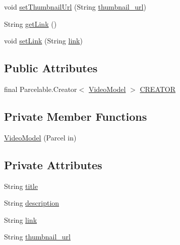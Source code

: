 \begin{DoxyCompactItemize}
\item 
void \hyperlink{classorg_1_1buildmlearn_1_1videocollection_1_1data_1_1VideoModel_a73e2eac36501e245f07df1b06d91e07a}{set\+Thumbnail\+Url} (String \hyperlink{classorg_1_1buildmlearn_1_1videocollection_1_1data_1_1VideoModel_ad793fdd9dc6317f284926a25a1906372}{thumbnail\+\_\+url})
\item 
String \hyperlink{classorg_1_1buildmlearn_1_1videocollection_1_1data_1_1VideoModel_a16fdc757e743c44f10fdc347318a887f}{get\+Link} ()
\item 
void \hyperlink{classorg_1_1buildmlearn_1_1videocollection_1_1data_1_1VideoModel_a432dd877f44698728efcd28c8bf20765}{set\+Link} (String \hyperlink{classorg_1_1buildmlearn_1_1videocollection_1_1data_1_1VideoModel_acf994b6c064aa05c64e86bb6b74b6d64}{link})
\end{DoxyCompactItemize}
\subsection*{Public Attributes}
\begin{DoxyCompactItemize}
\item 
final Parcelable.\+Creator$<$ \hyperlink{classorg_1_1buildmlearn_1_1videocollection_1_1data_1_1VideoModel}{Video\+Model} $>$ \hyperlink{classorg_1_1buildmlearn_1_1videocollection_1_1data_1_1VideoModel_a221472985206d46cac0d7dc5541fc58b}{C\+R\+E\+A\+T\+OR}
\end{DoxyCompactItemize}
\subsection*{Private Member Functions}
\begin{DoxyCompactItemize}
\item 
\hyperlink{classorg_1_1buildmlearn_1_1videocollection_1_1data_1_1VideoModel_a458ec46b11011f7730c7ef8419032424}{Video\+Model} (Parcel in)
\end{DoxyCompactItemize}
\subsection*{Private Attributes}
\begin{DoxyCompactItemize}
\item 
String \hyperlink{classorg_1_1buildmlearn_1_1videocollection_1_1data_1_1VideoModel_a9167ad2db7e5f86d94b0a627d74a10b7}{title}
\item 
String \hyperlink{classorg_1_1buildmlearn_1_1videocollection_1_1data_1_1VideoModel_a46c463c496e66a09acc123535f17fbec}{description}
\item 
String \hyperlink{classorg_1_1buildmlearn_1_1videocollection_1_1data_1_1VideoModel_acf994b6c064aa05c64e86bb6b74b6d64}{link}
\item 
String \hyperlink{classorg_1_1buildmlearn_1_1videocollection_1_1data_1_1VideoModel_ad793fdd9dc6317f284926a25a1906372}{thumbnail\+\_\+url}
\end{DoxyCompactItemize}


